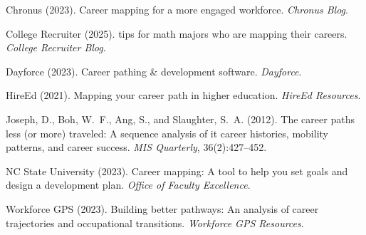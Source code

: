 \documentclass[../main.tex]{subfiles}
\begin{document}

\begin{thebibliography}{99}

Chronus (2023).
\newblock Career mapping for a more engaged workforce.
\newblock \emph{Chronus Blog}.

College Recruiter (2025).
 tips for math majors who are mapping their careers.
\newblock \emph{College Recruiter Blog}.

Dayforce (2023).
\newblock Career pathing \& development software.
\newblock \emph{Dayforce}.

HireEd (2021).
\newblock Mapping your career path in higher education.
\newblock \emph{HireEd Resources}.

Joseph, D., Boh, W.~F., Ang, S., and Slaughter, S.~A. (2012).
\newblock The career paths less (or more) traveled: A sequence analysis of it career histories, mobility patterns, and career success.
\newblock \emph{MIS Quarterly}, 36(2):427--452.

NC State University (2023).
\newblock Career mapping: A tool to help you set goals and design a development plan.
\newblock \emph{Office of Faculty Excellence}.

Workforce GPS (2023).
\newblock Building better pathways: An analysis of career trajectories and occupational transitions.
\newblock \emph{Workforce GPS Resources}.

\end{thebibliography}
\end{document}
